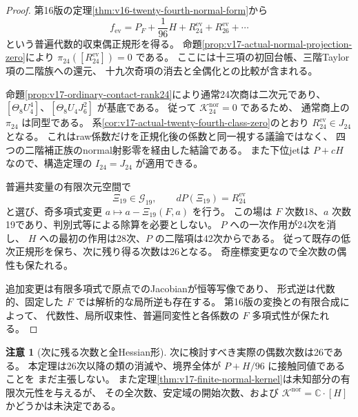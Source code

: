 \documentclass[a4paper,11pt]{ltjsarticle}
\theoremstyle{definition}
\newtheorem{remark}[theorem]{注意}
\begin{document}
\begin{proof}
第16版の定理\ref{thm:v16-twenty-fourth-normal-form}から
\[
 f_{\mathrm{ev}}=P_F+\frac1{96}H+R_{24}^{\mathrm{ev}}
                                      +R_{26}^{\mathrm{ev}}+\cdots
\]
という普遍代数的収束偶正規形を得る。
命題\ref{prop:v17-actual-normal-projection-zero}により
$\pi_{24}([R_{24}^{\mathrm{ev}}])=0$ である。
ここには十三項の初回台帳、三階Taylor項の二階族への還元、
十九次奇項の消去と全偶化との比較が含まれる。

命題\ref{prop:v17-ordinary-contact-rank24}により通常24次商は二次元であり、
$[\Theta_8U_4^4]$、$[\Theta_8U_4J_6^2]$ が基底である。
従って $\mathcal K_{24}^{\mathrm{nor}}=0$ であるため、
通常商上の $\pi_{24}$ は同型である。
系\ref{cor:v17-actual-twenty-fourth-class-zero}のとおり
$R_{24}^{\mathrm{ev}}\in J_{24}$ となる。
これはraw係数だけを正規化後の係数と同一視する議論ではなく、
四つの二階補正族のnormal射影零を経由した結論である。
また下位jetは $P+cH$ なので、構造定理の $I_{24}=J_{24}$ が適用できる。

普遍共変量の有限次元空間で
\[
 \Xi_{19}\in\mathcal G_{19},\qquad dP(\Xi_{19})=R_{24}^{\mathrm{ev}}
\]
と選び、奇多項式変更 $a\mapsto a-\Xi_{19}(F,a)$ を行う。
この場は $F$ 次数18、$a$ 次数19であり、判別式等による除算を必要としない。
$P$ への一次作用が24次を消し、
$H$ への最初の作用は28次、$P$ の二階項は42次からである。
従って既存の低次正規形を保ち、次に残り得る次数は26となる。
奇座標変更なので全次数の偶性も保たれる。

追加変更は有限多項式で原点でのJacobianが恒等写像であり、
形式逆は代数的、固定した $F$ では解析的な局所逆も存在する。
第16版の変換との有限合成によって、
代数性、局所収束性、普遍同変性と各係数の $F$ 多項式性が保たれる。
\end{proof}

\begin{remark}[次に残る次数と全Hessian形]
次に検討すべき実際の偶数次数は26である。
本定理は26次以降の類の消滅や、境界全体が $P+H/96$ に接触同値であることを
まだ主張しない。
また定理\ref{thm:v17-finite-normal-kernel}は未知部分の有限次元性を与えるが、
その全次数、安定域の開始次数、および
$\mathcal K^{\mathrm{nor}}=\mathbb C\cdot[H]$ かどうかは未決定である。
\end{remark}


\clearpage
\end{document}
